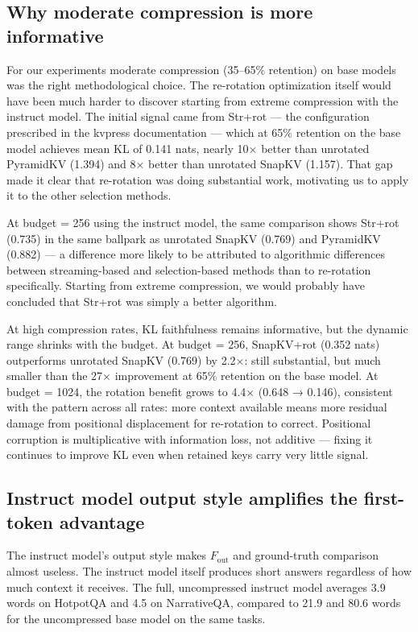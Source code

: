 \documentclass[10pt,letterpaper]{article}
\begin{document}
\subsection*{Why moderate compression is more informative}

For our experiments moderate compression (35--65\% retention) on base models
was the right methodological choice. 
The re-rotation optimization itself would
have been much harder to discover starting from extreme compression with the 
instruct model. The
initial signal came from Str+rot --- the
configuration prescribed in the kvpress documentation --- which at 65\%
retention on the base model achieves mean KL of 0.141 nats, nearly 10×
better than unrotated PyramidKV (1.394) and 8× better than unrotated
SnapKV (1.157). That gap made it clear that re-rotation was doing
substantial work, motivating us to apply it to the other selection methods.

At budget = 256 using the instruct model, the same comparison shows
Str+rot (0.735) in the same ballpark as unrotated SnapKV (0.769)
and PyramidKV (0.882) --- a difference more likely to be attributed to
algorithmic differences between streaming-based and selection-based
methods than to re-rotation specifically. Starting from extreme compression,
we would probably have concluded that Str+rot was simply a better algorithm.

At high compression rates, KL faithfulness remains informative, but the dynamic range shrinks with the budget. 
At budget = 256, SnapKV+rot (0.352 nats) outperforms unrotated SnapKV (0.769) by 2.2×: 
still substantial, but much smaller than the 27× improvement at 65\% retention on the base model.
At budget = 1024, the rotation
benefit grows to 4.4× (0.648 → 0.146), consistent with the pattern
across all rates: more context available means more residual damage from
positional displacement for re-rotation to correct.
Positional corruption is multiplicative with information
loss, not additive --- fixing it continues to improve KL even when
retained keys carry very little signal. 

\subsection*{Instruct model output style amplifies the first-token advantage}

The instruct model's output style makes
\(F_{\text{out}}\) and ground-truth comparison 
almost useless. The instruct model itself
produces short answers regardless of how much context it receives. The
full, uncompressed instruct model averages 3.9 words on HotpotQA and
4.5 on NarrativeQA, compared to 21.9 and 80.6 words for the
uncompressed base model on the same tasks.
\end{document}
